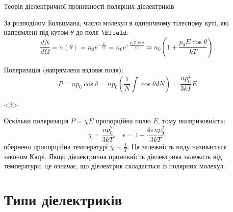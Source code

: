 \documentclass[]{beamer}
\begin{document}
\begin{frame}{Теорія діелектричної проникності полярних діелектриків}{}
\begin{onlyenv}
\begin{center}
\begin{tikzpicture}[>=latex, scale=0.7, transform shape]
			\end{tikzpicture}
		\end{center}
	\end{onlyenv}
	\vspace*{-2em}
	\begin{overprint}
		\begin{block}{}\justifying\small
			За розподілом Больцмана, число молекул в одиничному тілесному куті, які напрямлені під кутом
			$\theta$ до поля $\Efield$:
			\begin{equation*}
				\frac{dN}{d\Omega} = n(\theta) = n_0e^{-\frac{U}{kT}} =
				n_0e^{+\frac{p_0E\cos\theta}{kT}}
				\approx  n_0\left(1 + \frac{p_0E\cos\theta}{kT}\right).
			\end{equation*}
		\end{block}
		\begin{block}{}
			Поляризація (напрямлена вздовж поля):
			\begin{equation*}
				P =  n p_0 \overline{\cos\theta} = n p_0 \left( \frac 1N \int \cos\theta d N\right)  =
				\frac{n
					p_0^2}{3kT}E
			\end{equation*}
		\end{block}
	\end{overprint}
	\begin{onlyenv}
		\begin{block}{}\justifying
			Оскільки поляризація $P = \chi E$ пропорційна полю $E$, тому  поляризовність:
			\begin{equation*}
				\chi = \frac{n p_0^2}{3kT}. \quad \epsilon = 1 + \frac{4\pi np_0^2}{3kT}.
			\end{equation*}
			обернено пропорційна температурі $\chi \sim \frac1T$. Ця залежність виду називається \alert{законом
				Кюрі}. Якщо діелектрична проникність діелектрика залежить від температури, це означає, що
			діелектрик складається із полярних молекул.
		\end{block}
	\end{onlyenv}
\end{frame}



\section{Типи діелектриків}
\end{document}
